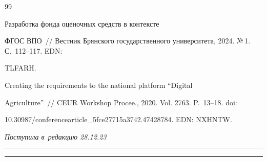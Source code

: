 {{\begin{thebibliography}{99}


   Разработка фонда оценочных средств в контексте 


ФГОС ВПО~/\!\!/ Вестник Брянского государственного университета, 2024. №\,1. С.~112--117.  EDN: 


TLFARH.


  




   Creating the requirements to the national platform ``Digital 


Agriculture''~/\!\!/ CEUR Workshop Procee., 2020. Vol. 2763. P.~13--18. doi: 


10.30987\!/\!conferencearticle\_5fce27715a3742.47428784. EDN: NXHNTW.


     \end{thebibliography}


} }











\vspace*{-6pt}





\hfill{\small\textit{Поступила в~редакцию 28.12.23}}





\vspace*{8pt}





\hrule





\vspace*{2pt}








\hrule




















